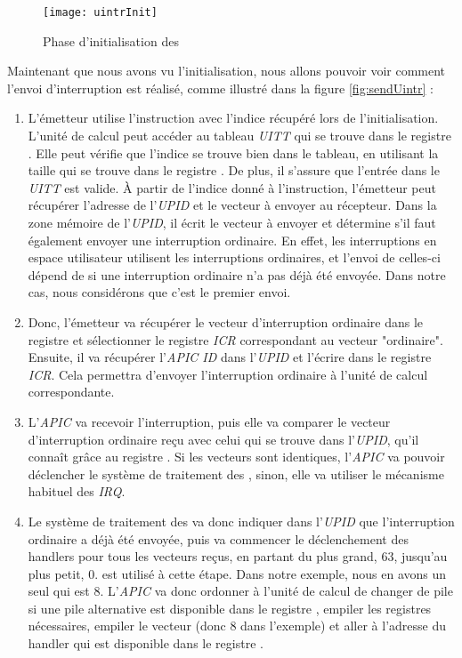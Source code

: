 \begin{figure}[H]
  \texttt{[image: uintrInit]}
  \caption{Phase d'initialisation des \uintr{}}
  \label{fig:initUintr}
\end{figure}

Maintenant que nous avons vu l'initialisation, nous allons pouvoir voir comment l'envoi d'interruption est réalisé, comme illustré dans la figure \ref{fig:sendUintr} :

\begin{enumerate}[label=\protect\circled{\arabic*}]
  \item L'émetteur utilise l'instruction  avec l'indice récupéré lors de l'initialisation.
  L'unité de calcul peut accéder au tableau \emph{UITT} qui se trouve dans le registre .
  Elle peut vérifie que l'indice se trouve bien dans le tableau, en utilisant la taille qui se trouve dans le registre .
  De plus, il s'assure que l'entrée dans le \emph{UITT} est valide.
  À partir de l'indice donné à l'instruction, l'émetteur peut récupérer l'adresse de l'\emph{UPID} et le vecteur \uintr{} à envoyer au récepteur.
  Dans la zone mémoire de l'\emph{UPID}, il écrit le vecteur \uintr{} à envoyer et détermine s'il faut également envoyer une interruption ordinaire.
  En effet, les interruptions en espace utilisateur utilisent les interruptions ordinaires,
  et l'envoi de celles-ci dépend de si une interruption ordinaire n'a pas déjà été envoyée.
  Dans notre cas, nous considérons que c'est le premier envoi.
  \item Donc, l'émetteur va récupérer le vecteur d'interruption ordinaire dans le registre  et
  sélectionner le registre \emph{ICR} correspondant au vecteur "ordinaire".
  Ensuite, il va récupérer l'\emph{APIC ID} dans l'\emph{UPID} et l'écrire dans le registre \emph{ICR}.
  Cela permettra d'envoyer l'interruption ordinaire à l'unité de calcul correspondante.
  \item L'\emph{APIC} va recevoir l'interruption, puis elle va comparer le vecteur d'interruption ordinaire reçu avec celui qui se trouve dans l'\emph{UPID}, qu'il connaît grâce au registre .
  Si les vecteurs sont identiques, l'\emph{APIC} va pouvoir déclencher le système de traitement des \uintr{}, sinon, elle va utiliser le mécanisme habituel des \emph{IRQ}.

  \item Le système de traitement des \uintr{} va donc indiquer dans l'\emph{UPID} que l'interruption ordinaire a déjà été envoyée,
  puis va commencer le déclenchement des handlers pour tous les vecteurs \uintr{} reçus, en partant du plus grand, 63, jusqu'au plus petit, 0.
   est utilisé à cette étape.
  Dans notre exemple, nous en avons un seul qui est 8.
  L'\emph{APIC} va donc ordonner à l'unité de calcul de changer de pile si une pile alternative est disponible dans
  le registre , empiler les registres nécessaires, empiler le vecteur \uintr{} (donc 8 dans l'exemple) et aller à l'adresse du handler qui est disponible dans le registre .
\end{enumerate}

